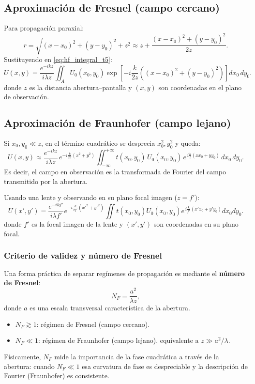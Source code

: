 \documentclass[12pt, a4paper]{article}
\theoremstyle{plain}
\theoremstyle{definition}
\theoremstyle{remark}
\begin{document}
\subsection{Aproximación de Fresnel (campo cercano)}

Para propagación paraxial:
\[
  r=\sqrt{(x-x_0)^2+(y-y_0)^2+z^2}
  \approx
  z+\frac{(x-x_0)^2+(y-y_0)^2}{2z}.
\]
Sustituyendo en \eqref{eq:hf_integral_t5}:
\begin{equation}
  U(x,y)=\frac{e^{-ikz}}{i\lambda z}
  \iint_A U_0(x_0,y_0)
  \exp\!\left[-i\frac{k}{2z}\left((x-x_0)^2+(y-y_0)^2\right)\right]
  dx_0\,dy_0.
  \label{eq:fresnel_t5}
\end{equation}
donde $z$ es la distancia abertura--pantalla y $(x,y)$ son coordenadas en el
plano de observación.

\subsection{Aproximación de Fraunhofer (campo lejano)}

Si $x_0,y_0\ll z$, en el término cuadrático se desprecia $x_0^2,y_0^2$ y queda:
\begin{equation}
  U(x,y)\approx
  \frac{e^{-ikz}}{i\lambda z}\,
  e^{-i\frac{k}{2z}(x^2+y^2)}
  \iint_{-\infty}^{+\infty}
  t(x_0,y_0)\,U_0(x_0,y_0)\,
  e^{\,i\frac{k}{z}(xx_0+yy_0)}\,dx_0\,dy_0.
  \label{eq:fraunhofer_t5}
\end{equation}
Es decir, el campo en observación es la transformada de Fourier del campo
transmitido por la abertura.

Usando una lente y observando en su plano focal imagen ($z=f'$):
\begin{equation}
  U(x',y')=
  \frac{e^{-ikf'}}{i\lambda f'}
  e^{-i\frac{k}{2f'}(x'^2+y'^2)}
  \iint
  t(x_0,y_0)U_0(x_0,y_0)
  e^{\,i\frac{k}{f'}(x'x_0+y'y_0)}dx_0dy_0.
  \label{eq:fraunhofer_lente_t5}
\end{equation}
donde $f'$ es la focal imagen de la lente y $(x',y')$ son coordenadas en su
plano focal.

\subsubsection{Criterio de validez y número de Fresnel}

Una forma práctica de separar regímenes de propagación es mediante el
\textbf{número de Fresnel}:
\begin{equation}
  N_F=\frac{a^2}{\lambda z},
  \label{eq:fresnel_number_t5}
\end{equation}
donde $a$ es una escala transversal característica de la abertura.
\begin{itemize}
  \item $N_F\gtrsim 1$: régimen de Fresnel (campo cercano).
  \item $N_F\ll 1$: régimen de Fraunhofer (campo lejano), equivalente a
  $z\gg a^2/\lambda$.
\end{itemize}
Físicamente, $N_F$ mide la importancia de la fase cuadrática a través de la
abertura: cuando $N_F\ll 1$ esa curvatura de fase es despreciable y la
descripción de Fourier (Fraunhofer) es consistente.
\end{document}
